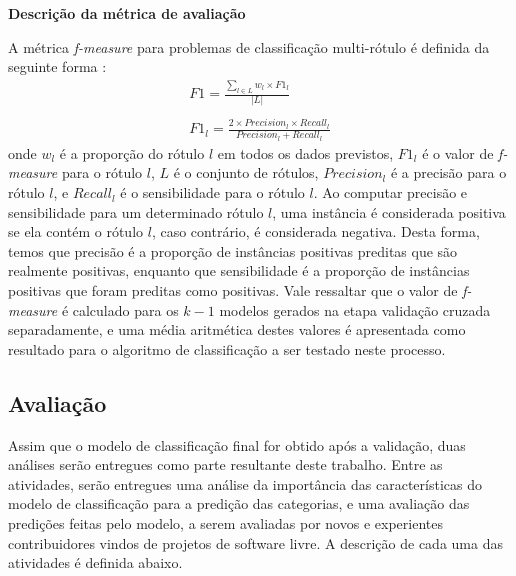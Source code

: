 \textbf{Descrição da métrica de avaliação}

A métrica \textit{f-measure} para problemas de classificação multi-rótulo é definida da seguinte forma \citep{panichella2015how}:
\begin{equation}
\begin{split}
F1 = \frac{\sum_{l \in L} w_l \times F1_l}{\left | L \right | }\\\\
F1_l = \frac{2 \times Precision_l \times Recall_l}{Precision_l + Recall_l}
\end{split}
\end{equation}
onde $w_l$ é a proporção do rótulo $l$ em todos os dados previstos, $F1_l$ é o valor de \textit{f-measure} para o rótulo $l$, $L$ é o conjunto de rótulos, $Precision_l$ é a precisão para o rótulo $l$, e $Recall_l$ é o sensibilidade para o rótulo $l$. Ao computar precisão e sensibilidade para um determinado rótulo $l$, uma instância é considerada positiva se ela contém o rótulo $l$, caso contrário, é considerada negativa. Desta forma, temos que precisão é a proporção de instâncias positivas preditas que são realmente positivas, enquanto que sensibilidade é a proporção de instâncias positivas que foram preditas como positivas. Vale ressaltar que o valor de \textit{f-measure} é calculado para os $k - 1$ modelos gerados na etapa validação cruzada separadamente, e uma média aritmética destes valores é apresentada como resultado para o algoritmo de classificação a ser testado neste processo.

\subsection{Avaliação}
\label{sec:avaliacao}
Assim que o modelo de classificação final for obtido após a validação, duas análises serão entregues como parte resultante deste trabalho. Entre as atividades, serão entregues uma análise da importância das características do modelo de classificação para a predição das categorias, e uma avaliação das predições feitas pelo modelo, a serem avaliadas por novos e experientes contribuidores vindos de projetos de software livre. A descrição de cada uma das atividades é definida abaixo.


